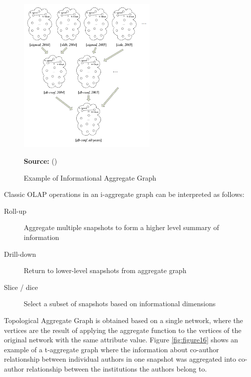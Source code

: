 \begin{figure}[ht]
\centering
\caption{Example of Informational Aggregate Graph}
\label{fig:figure15}
\includegraphics[width=0.6\textwidth]{images/i_aggregated_graph_example.png}
\par\medskip\ABNTEXfontereduzida\selectfont\textbf{Source:} \citeauthor{Chen2008} (\citeyear{Chen2008}) \par\medskip
\end{figure}

Classic OLAP operations in an i-aggregate graph can be interpreted as follows:
\begin{description}
\item[Roll-up] Aggregate multiple snapshots to form a higher level summary of information
\item[Drill-down] Return to lower-level snapshots from aggregate graph
\item[Slice / dice] Select a subset of snapshots based on informational dimensions
\end{description}

Topological Aggregate Graph is obtained based on a single network, where the vertices are the result of applying the aggregate function to the vertices of the original network with the same attribute value. Figure \ref{fig:figure16} shows an example of a t-aggregate graph where the information about co-author relationship between individual authors in one snapshot was aggregated into co-author relationship between the institutions the authors belong to.

